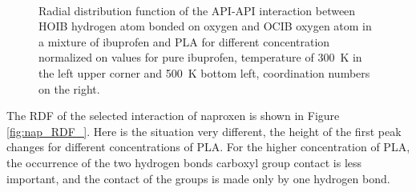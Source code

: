 \begin{figure}[htb!]
	\centering
	\\
	\caption{Radial distribution function of the API-API interaction between HOIB hydrogen atom bonded on oxygen and OCIB oxygen atom in a mixture of ibuprofen and PLA for different concentration normalized on values for pure ibuprofen, temperature of 300~K in the left upper corner and 500~K bottom left, coordination numbers on the right.}
	\label{fig:ibu_s_RDF_}
\end{figure}

The RDF of the selected interaction of naproxen is shown in Figure \ref{fig:nap_RDF_}. Here is the situation very different, the height of the first peak changes for different concentrations of PLA. For the higher concentration of PLA, the occurrence of the two hydrogen bonds carboxyl group contact is less important, and the contact of the groups is made only by one hydrogen bond.

